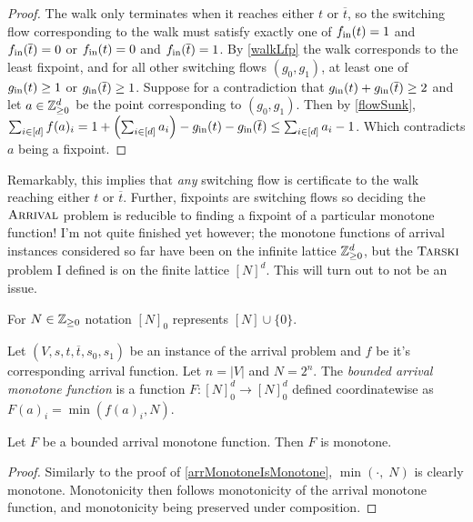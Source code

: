   \begin{proof}
    The walk only terminates when it reaches either $t$ or $\overline{t}$, so the switching flow corresponding
    to the walk must satisfy exactly one of $f_{\text{in}}(t) = 1$ and $f_{\text{in}}(\overline{t}) = 0$ or 
    $f_{\text{in}}(t) = 0$ and $f_{\text{in}}(\overline{t}) = 1$. By \cref{walkLfp} the walk corresponds
    to the least fixpoint, and for all other switching flows $(g_0, g_1)$, at least one of $g_{\text{in}} (t) \geq 1$ or
    $g_{\text{in}} (\overline{t}) \geq 1$. Suppose for a contradiction that $g_{\text{in}} (t) + g_{\text{in}} (\overline{t}) \geq 2$ and let
    $a \in \mathbb{Z}_{\geq 0}^d$ be the point corresponding to $(g_0, g_1)$. Then by \cref{flowSunk},
      $\sum_{i \in [d]} f(a)_i = 1 + \left( \sum_{i \in [d]} a_i\right) 
        - g_{\text{in}}(t) - g_{\text{in}}(\overline{t})
                              \leq \sum_{i \in [d]} a_i - 1$.
    Which contradicts $a$ being a fixpoint.
  \end{proof}
  Remarkably, this implies that \emph{any} switching flow is certificate to the walk reaching either $t$
  or $\overline{t}$. Further, fixpoints are switching flows so deciding the $\textsc{Arrival}$ problem is reducible
  to finding a fixpoint of a particular monotone function! I'm not quite finished yet however;
  the monotone functions of arrival instances considered so far have been on the infinite lattice $\mathbb{Z}_{\geq 0}^d$, but
  the $\textsc{Tarski}$ problem I defined is on the finite lattice $[N]^d$. This will turn out to not be an issue.
  \begin{notation}
    For $N \in \mathbb{Z}_{\geq 0}$ notation $[N]_0$ represents $[N] \cup \{0\}$.
  \end{notation}
  \newcommand{\no}{[N]_0}
  \begin{definition}
    Let $(V, s, t, \overline{t}, s_0, s_1)$ be an instance of the arrival problem and $f$
    be it's corresponding arrival function. Let $n = |V|$ and $N = 2^n$. The \emph{bounded arrival monotone function}
    is a function $F : \no^d \to \no^d$ defined coordinatewise as $F(a)_i = \min(f(a)_i, N)$. 
  \end{definition}
  \begin{lemma}
    Let $F$ be a bounded arrival monotone function. Then $F$ is monotone.
  \end{lemma}
  \begin{proof}
    Similarly to the proof of \cref{arrMonotoneIsMonotone}, $\min(\cdot, \; N)$ is clearly monotone.
    Monotonicity then follows monotonicity of the arrival monotone function, and monotonicity
    being preserved under composition.
  \end{proof}
